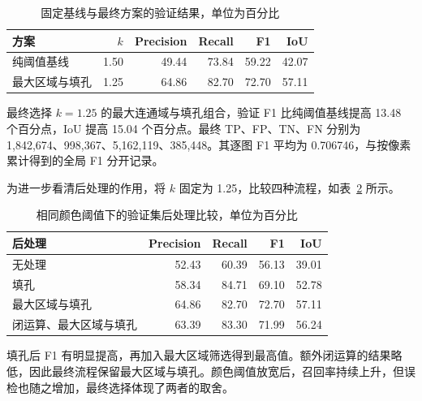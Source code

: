 \begin{table}[H]
\centering
\small
\caption{固定基线与最终方案的验证结果，单位为百分比}\label{tab:validation}
\begin{tabular}{lrrrrr}
\toprule
方案 & $k$ & Precision & Recall & F1 & IoU \\
\midrule
纯阈值基线 & 1.50 & 49.44 & 73.84 & 59.22 & 42.07 \\
最大区域与填孔 & 1.25 & 64.86 & 82.70 & 72.70 & 57.11 \\
\bottomrule
\end{tabular}
\end{table}

最终选择 $k=1.25$ 的最大连通域与填孔组合，验证 F1 比纯阈值基线提高 13.48 个百分点，IoU 提高 15.04 个百分点。最终 TP、FP、TN、FN 分别为 1,842,674、998,367、5,162,119、385,448。其逐图 F1 平均为 0.706746，与按像素累计得到的全局 F1 分开记录。

为进一步看清后处理的作用，将 $k$ 固定为 1.25，比较四种流程，如表~\ref{tab:postvalidation} 所示。

\begin{table}[H]
\centering
\small
\caption{相同颜色阈值下的验证集后处理比较，单位为百分比}\label{tab:postvalidation}
\begin{tabular}{lrrrr}
\toprule
后处理 & Precision & Recall & F1 & IoU \\
\midrule
无处理 & 52.43 & 60.39 & 56.13 & 39.01 \\
填孔 & 58.34 & 84.71 & 69.10 & 52.78 \\
最大区域与填孔 & 64.86 & 82.70 & 72.70 & 57.11 \\
闭运算、最大区域与填孔 & 63.39 & 83.30 & 71.99 & 56.24 \\
\bottomrule
\end{tabular}
\end{table}

填孔后 F1 有明显提高，再加入最大区域筛选得到最高值。额外闭运算的结果略低，因此最终流程保留最大区域与填孔。颜色阈值放宽后，召回率持续上升，但误检也随之增加，最终选择体现了两者的取舍。

